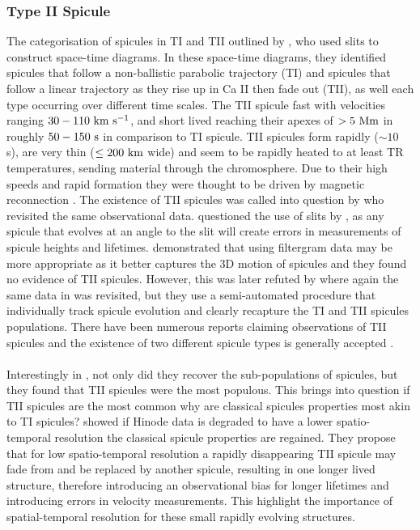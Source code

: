 \documentclass[12pt]{ociamthesis}
\newcommand{\kms}{~\rm{km ~s^{-1}}}
\newcommand{\np}{\\ \\}
\begin{document}
\subsubsection{Type II Spicule}
\label{subsec:TII}
The categorisation of spicules in TI and TII outlined by \citep{Pontieu2007PASJ}, who used slits to construct space-time diagrams. In these space-time diagrams, they identified spicules that follow a non-ballistic parabolic trajectory (TI) and spicules that follow a linear trajectory as they rise up in Ca II then fade out (TII), as well each type occurring over different time scales. The TII spicule fast with velocities ranging $30-110\kms$, and short lived reaching their apexes of $>5~\rm{Mm}$ in roughly $50-150~\rm{s}$ in comparison to TI spicule. TII spicules form rapidly ($\sim 10$ s), are very thin ($\leq 200~\rm{km}$ wide) and seem to be rapidly heated to at least TR temperatures, sending material through the chromosphere. Due to their high speeds and rapid formation they were thought to be driven by magnetic reconnection \citep{Pontieu2007PASJ}. The existence of TII spicules was called into question by \cite{Zhang2012ApJ} who revisited the same observational data. \cite{Zhang2012ApJ} questioned the use of slits by \cite{Pontieu2007PASJ}, as any spicule that evolves at an angle to the slit will create errors in measurements of spicule heights and lifetimes. \cite{Zhang2012ApJ} demonstrated that using filtergram data may be more appropriate as it better captures the 3D motion of spicules and they found no evidence of TII spicules. However, this was later refuted by \cite{Pereira2012} where again the same data in \cite{Pontieu2007PASJ} was revisited, but they use a semi-automated procedure that individually track spicule evolution and clearly recapture the TI and TII spicules populations. There have been numerous reports claiming observations of TII spicules and the existence of two different spicule types is generally accepted \citep{Rouppe2009ApJ, Rouppe2015ApJ799L3R, Shetye2016AA589A3S, Rutten2019AA632A96R, Yurchyshyn2020ApJ891L21Y, Chintzoglou2021ApJ90682C}. \np   
%
Interestingly in \cite{Pereira2012}, not only did they recover the sub-populations of spicules, but they found that TII spicules were the most populous. This brings into question if TII spicules are the most common why are classical spicules properties most akin to TI spicules? \cite{Pereira2013ApJ76469P} showed if Hinode data is degraded to have a lower spatio-temporal resolution the classical spicule properties are regained. They propose that for low spatio-temporal resolution a rapidly disappearing TII spicule may fade from and be replaced by another spicule, resulting in one longer lived structure, therefore introducing an observational bias for longer lifetimes and introducing errors in velocity measurements. This highlight the importance of spatial-temporal resolution for these small rapidly evolving structures.\np
\end{document}
